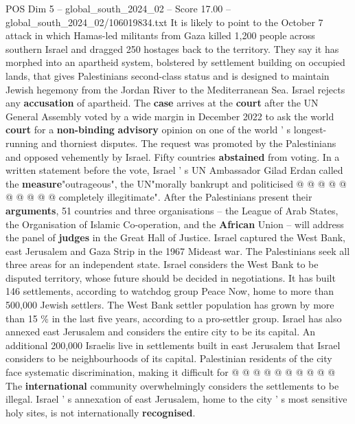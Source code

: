 \begin{textsample}{POS Dim 5 – global\_south\_2024\_02 – Score 17.00 – global\_south\_2024\_02/106019834.txt}
It is likely to point to the October 7 attack in which Hamas-led militants from Gaza killed 1,200 people across southern Israel and dragged 250 hostages back to the territory.
They say it has morphed into an apartheid system, bolstered by settlement building on occupied lands, that gives Palestinians second-class status and is designed to maintain Jewish hegemony from the Jordan River to the Mediterranean Sea.
Israel rejects any \textbf{accusation} of apartheid.
The \textbf{case} arrives at the \textbf{court} after the UN General Assembly voted by a wide margin in December 2022 to ask the world \textbf{court} for a \textbf{non-binding} \textbf{advisory} opinion on one of the world ' s longest-running and thorniest disputes.
The request was promoted by the Palestinians and opposed vehemently by Israel.
Fifty countries \textbf{abstained} from voting.
In a written statement before the vote, Israel ' s UN Ambassador Gilad Erdan called the \textbf{measure}"outrageous", the UN"morally bankrupt and politicised @ @ @ @ @ @ @ @ @ @ completely illegitimate".
After the Palestinians present their \textbf{arguments}, 51 countries and three organisations -- the League of Arab States, the Organisation of Islamic Co-operation, and the \textbf{African} Union -- will address the panel of \textbf{judges} in the Great Hall of Justice.
Israel captured the West Bank, east Jerusalem and Gaza Strip in the 1967 Mideast war.
The Palestinians seek all three areas for an independent state.
Israel considers the West Bank to be disputed territory, whose future should be decided in negotiations.
It has built 146 settlements, according to watchdog group Peace Now, home to more than 500,000 Jewish settlers.
The West Bank settler population has grown by more than 15 \% in the last five years, according to a pro-settler group.
Israel has also annexed east Jerusalem and considers the entire city to be its capital.
An additional 200,000 Israelis live in settlements built in east Jerusalem that Israel considers to be neighbourhoods of its capital.
Palestinian residents of the city face systematic discrimination, making it difficult for @ @ @ @ @ @ @ @ @ @ The \textbf{international} community overwhelmingly considers the settlements to be illegal.
Israel ' s annexation of east Jerusalem, home to the city ' s most sensitive holy sites, is not internationally \textbf{recognised}.

\end{textsample}
